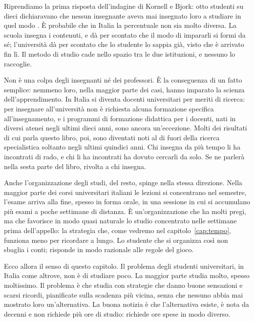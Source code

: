 Riprendiamo la prima risposta dell'indagine di Kornell e Bjork: otto
studenti su dieci dichiaravano che nessun insegnante aveva mai insegnato
loro a studiare in quel modo \parencite{kornell2007}. È probabile che in
Italia la percentuale non sia molto diversa. La scuola insegna i
contenuti, e dà per scontato che il modo di impararli si formi da sé;
l'università dà per scontato che lo studente lo sappia già, visto che è
arrivato fin lì. Il metodo di studio cade nello spazio tra le due
istituzioni, e nessuno lo raccoglie.

Non è una colpa degli insegnanti né dei professori. È la conseguenza di
un fatto semplice: nemmeno loro, nella maggior parte dei casi, hanno
imparato la scienza dell'apprendimento. In Italia si diventa docenti
universitari per meriti di ricerca: per insegnare all'università non è
richiesta alcuna formazione specifica all'insegnamento, e i programmi
di formazione didattica per i docenti, nati in diversi atenei negli
ultimi dieci anni, sono ancora un'eccezione. Molti dei risultati di cui
parla questo libro, poi, sono diventati noti al di fuori della ricerca
specialistica soltanto negli ultimi quindici anni. Chi insegna da più
tempo li ha incontrati di rado, e chi li ha incontrati ha dovuto
cercarli da solo. Se ne parlerà nella sesta parte del libro, rivolta a
chi insegna.

Anche l'organizzazione degli studi, del resto, spinge nella stessa
direzione. Nella maggior parte dei corsi universitari italiani le
lezioni si concentrano nel semestre, l'esame arriva alla fine, spesso in
forma orale, in una sessione in cui si accumulano più esami a poche
settimane di distanza. È un'organizzazione che ha molti pregi, ma che
favorisce in modo quasi naturale lo studio concentrato nelle settimane
prima dell'appello: la strategia che, come vedremo nel
capitolo~\ref{cap:tempo}, funziona meno per ricordare a lungo. Lo
studente che si organizza così non sbaglia i conti; risponde in modo
razionale alle regole del gioco.

Ecco allora il senso di questo capitolo. Il problema degli studenti
universitari, in Italia come altrove, non è di studiare poco. La
maggior parte studia molto, spesso moltissimo. Il problema è che studia
con strategie che danno buone sensazioni e scarsi ricordi, pianificate
sulla scadenza più vicina, senza che nessuno abbia mai mostrato loro
un'alternativa. La buona notizia è che l'alternativa esiste, è nota da
decenni e non richiede più ore di studio: richiede ore spese in modo
diverso.


